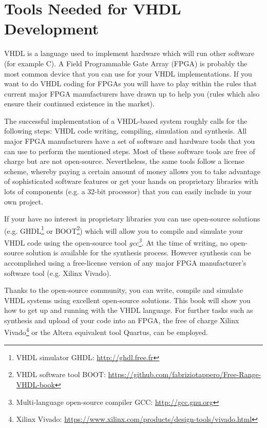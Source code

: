 \section{Tools Needed for VHDL Development}
VHDL is a language used to implement hardware which will run other software (for example C). A Field Programmable Gate Array (FPGA) is probably the most common device that you can use for your VHDL implementations. If you want to do VHDL coding for FPGAs you will have to play within the rules that current major FPGA manufacturers have drawn up to help you (rules which also ensure their continued existence in the market).

The successful implementation of a VHDL-based system roughly calls for the following steps: VHDL code writing, compiling, simulation and synthesis. All major FPGA manufacturers have a set of software and hardware tools that you can use to perform the mentioned steps. Most of these software tools are free of charge but are not open-source. Nevertheless, the same tools follow a license scheme, whereby paying a certain amount of money allows you to take advantage of sophisticated software features or get your hands on proprietary libraries with lots of components (e.g. a 32-bit processor) that you can easily include in your own project.

If your have no interest in proprietary libraries you can use open-source solutions (e.g. GHDL\footnote{VHDL simulator GHDL: {\footnotesize\url{http://ghdl.free.fr}}} or BOOT\footnote{VHDL software tool BOOT: {\footnotesize\url{https://github.com/fabriziotappero/Free-Range-VHDL-book}}}) which will allow you to compile and simulate your VHDL code using the open-source tool \textit{gcc\footnote{Multi-language open-source compiler GCC: {\footnotesize\url{http://gcc.gnu.org}}}}. At the time of writing, no open-source solution is available for the synthesis process. However synthesis can be accomplished using a free-license version of any major FPGA manufacturer's software tool (e.g. Xilinx Vivado).

Thanks to the open-source community, you can write, compile and simulate VHDL systems using excellent open-source solutions. This book will show you how to get up and running with the VHDL language. For further tasks such as synthesis and upload of your code into an FPGA, the free of charge Xilinx Vivado\footnote{Xilinx Vivado: {\scriptsize\url{https://www.xilinx.com/products/design-tools/vivado.html}}} or the Altera equivalent tool Quartus, can be employed.

